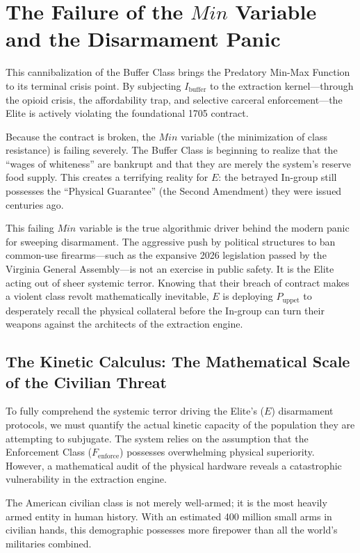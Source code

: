 \documentclass[12pt,openany]{book}
\begin{document}
\section{The Failure of the \texorpdfstring{$Min$}{Min} Variable and the Disarmament Panic}

This cannibalization of the Buffer Class brings the Predatory Min-Max Function to its terminal crisis point. By subjecting $I_{\text{buffer}}$ to the extraction kernel---through the opioid crisis, the affordability trap, and selective carceral enforcement---the Elite is actively violating the foundational 1705 contract.

Because the contract is broken, the $Min$ variable (the minimization of class resistance) is failing severely. The Buffer Class is beginning to realize that the ``wages of whiteness'' are bankrupt and that they are merely the system's reserve food supply. This creates a terrifying reality for $E$: the betrayed In-group still possesses the ``Physical Guarantee'' (the Second Amendment) they were issued centuries ago.

This failing $Min$ variable is the true algorithmic driver behind the modern panic for sweeping disarmament. The aggressive push by political structures to ban common-use firearms---such as the expansive 2026 legislation passed by the Virginia General Assembly---is not an exercise in public safety. It is the Elite acting out of sheer systemic terror. Knowing that their breach of contract makes a violent class revolt mathematically inevitable, $E$ is deploying $P_{\text{uppet}}$ to desperately recall the physical collateral before the In-group can turn their weapons against the architects of the extraction engine.

\subsection{The Kinetic Calculus: The Mathematical Scale of the Civilian Threat}

To fully comprehend the systemic terror driving the Elite's ($E$) disarmament protocols, we must quantify the actual kinetic capacity of the population they are attempting to subjugate. The system relies on the assumption that the Enforcement Class ($F_{\text{enforce}}$) possesses overwhelming physical superiority. However, a mathematical audit of the physical hardware reveals a catastrophic vulnerability in the extraction engine.

The American civilian class is not merely well-armed; it is the most heavily armed entity in human history. With an estimated 400 million small arms in civilian hands, this demographic possesses more firepower than all the world's militaries combined.
\end{document}
